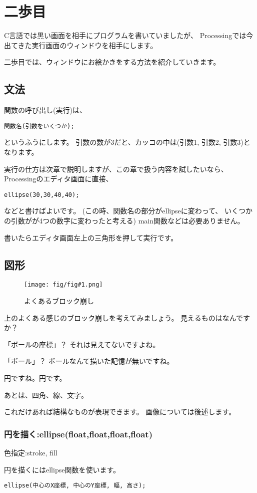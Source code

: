\documentclass[12pt,titlepage]{ltjsarticle}
\newcommand{\fig}[2]{\begin{figure}[htbp]%
\centering\texttt{[image: fig/fig\#1.png]}%
\caption{#2}\end{figure}}
\begin{document}
\section{二歩目}
C言語では黒い画面を相手にプログラムを書いていましたが、
Processingでは今出てきた実行画面のウィンドウを相手にします。

二歩目では、ウィンドウにお絵かきをする方法を紹介していきます。

\subsection{文法}
関数の呼び出し(実行)は、

\verb#関数名(引数をいくつか);#

というふうにします。
引数の数が3だと、カッコの中は(引数1, 引数2, 引数3)となります。

実行の仕方は次章で説明しますが、この章で扱う内容を試したいなら、
Processingのエディタ画面に直接、

\verb#ellipse(30,30,40,40);#

などと書けばよいです。
(この時、関数名の部分がellipseに変わって、
いくつかの引数がが4つの数字に変わったと考える)
main関数などは必要ありません。

書いたらエディタ画面左上の三角形を押して実行です。

\subsection{図形}

\fig{2-1}{よくあるブロック崩し}

上のよくある感じのブロック崩しを考えてみましょう。
見えるものはなんですか？

「ボールの座標」？
それは見えてないですよね。

「ボール」？
ボールなんて描いた記憶が無いですね。

円ですね。円です。

あとは、四角、線、文字。

これだけあれば結構なものが表現できます。
画像については後述します。

\subsubsection{円を描く:ellipse(float,float,float,float)}
色指定:stroke, fill

円を描くにはellipse関数を使います。

\verb#ellipse(中心のX座標, 中心のY座標, 幅, 高さ);#
\end{document}
